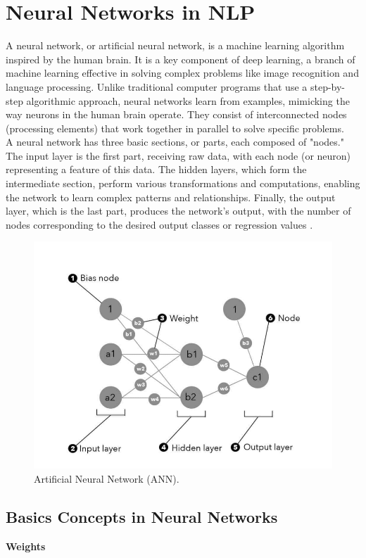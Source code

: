 \section{Neural Networks in NLP}
A neural network, or artificial neural network, is a machine learning algorithm inspired by the human brain. It is a key component of deep learning, a branch of machine learning effective in solving complex problems like image recognition and language processing. Unlike traditional computer programs that use a step-by-step algorithmic approach, neural networks learn from examples, mimicking the way neurons in the human brain operate. They consist of interconnected nodes (processing elements) that work together in parallel to solve specific problems. \\
A neural network has three basic sections, or parts, each composed of "nodes." \\ The input layer is the first part, receiving raw data, with each node (or neuron) representing a feature of this data. The hidden layers, which form the intermediate section, perform various transformations and computations, enabling the network to learn complex patterns and relationships. Finally, the output layer, which is the last part, produces the network's output, with the number of nodes corresponding to the desired output classes or regression values \cite{murugan2024nlp}.
\begin{figure}[htbp]
	
	\centerline{\includegraphics[width=.7\linewidth]{Figures/ANN.png}}
	\caption{Artificial Neural Network (ANN).}
	\label{ANN.png}
\end{figure}  

\subsection{Basics Concepts in Neural Networks}
\textbf{Weights} 


